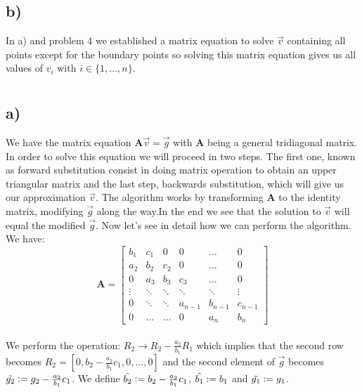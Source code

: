 \documentclass[a4paper,10pt,english]{article}
\begin{document}
\subsection{b)}
In a) and problem 4 we established a matrix equation to solve $\vec{v}$ containing all points except for the boundary points so solving this matrix equation gives us all values of $v_i$ with $i \in \{1, \dots, n\}$.



\section{} %
\subsection{a)}
We have the matrix equation $\boldsymbol{A}\vec{v} = \vec{g}$ with
$\boldsymbol{A}$ being a general tridiagonal matrix. In order to solve this
equation we will proceed in two steps. The first one, known as forward
substitution consist in doing matrix operation to obtain an upper triangular
matrix and the last step, backwards substitution, which will give us our
approximation $\vec{v}$.
The algorithm works by transforming  $\boldsymbol{A}$ to the identity matrix,
modifying $\vec{g}$ along the way.In the end we see that the solution to
$\vec{v}$ will equal the modified $\vec{g}$. Now let's see in detail how we can
perform the algorithm. \\

We have: \[
\boldsymbol{A} = \begin{bmatrix}
                 b_1 & c_1 & 0 & 0 & \dots & 0 \\
                  a_2 & b_2 & c_2 & 0 & \dots & 0\\
                 0 & a_3 & b_3 & c_3 & \dots & 0\\
                 \vdots & \ddots &  \ddots & \ddots & \ddots & \vdots \\
                 0 & \ddots &  \ddots & a_{n-1} & b_{n-1} & c_{n-1} \\
                 0 & \dots &  \dots & 0 & a_{n} & b_{n}
                 \end{bmatrix}
\]
\\

We perform the operation: $R_2 \rightarrow R_2 - \frac{a_2}{b_1}R_1$ which
implies that the second row becomes
$R_2 = [0, b_2 - \frac{a_2}{b_1}c_1, 0, \dots, 0]$ and the second element of
$\vec{g}$ becomes $\Tilde{g_2} := g_2 - \frac{a_2}{b_1}c_1$. We define
$\Tilde{b_2}:= b_2 - \frac{a_2}{b_1}c_1$, $\Tilde{b_1}:= b_1$ and
$\Tilde{g_1} := g_1$. \\
\end{document}
